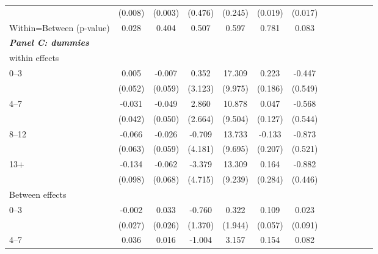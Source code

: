 \documentclass[12pt,english]{article}
\begin{document}
\begin{table}[!ht]
\begin{center}
\begin{adjustbox}{max width=.9\linewidth}
\begin{threeparttable}
{\begin{tabular}{l*{6}{S S}}
						&  (0.008)         &  (0.003)         &  (0.476)         &  (0.245)         &  (0.019)         &  (0.017)         \\
						Within=Between (p-value)&  0.028         &    0.404         &    0.507         &    0.597         &    0.781         &    0.083         \\
						\textit{\textbf{Panel C: dummies}} &&&&&&\\
						within effects&                  &                  &                  &                  &                  &                  \\
						0--3&    0.005         &   -0.007         &    0.352         &   17.309\sym{*}  &    0.223         &   -0.447         \\
						&  (0.052)         &  (0.059)         &  (3.123)         &  (9.975)         &  (0.186)         &  (0.549)         \\
						4--7&    -0.031         &   -0.049         &    2.860         &   10.878         &    0.047         &   -0.568         \\
						&  (0.042)         &  (0.050)         &  (2.664)         &  (9.504)         &  (0.127)         &  (0.544)         \\
						8--12&    -0.066         &   -0.026         &   -0.709         &   13.733         &   -0.133         &   -0.873\sym{*}  \\
						&  (0.063)         &  (0.059)         &  (4.181)         &  (9.695)         &  (0.207)         &  (0.521)         \\
						13+&   -0.134         &   -0.062         &   -3.379         &   13.309         &    0.164         &   -0.882\sym{**} \\
						&  (0.098)         &  (0.068)         &  (4.715)         &  (9.239)         &  (0.284)         &  (0.446)         \\
						Between effects&                  &                  &                  &                  &                  &                  \\
						0--3&      -0.002         &    0.033         &   -0.760         &    0.322         &    0.109\sym{*}  &    0.023         \\
						&  (0.027)         &  (0.026)         &  (1.370)         &  (1.944)         &  (0.057)         &  (0.091)         \\
						4--7&    0.036         &    0.016         &   -1.004         &    3.157         &    0.154\sym{**} &    0.082         \\

\end{tabular}}
\end{threeparttable}
\end{adjustbox}
\end{center}
\end{table}
\end{document}
